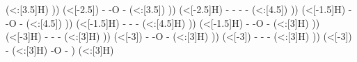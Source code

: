 \begin{struct}
{                        (<:[3.5]H)
                    ))
                      (<[-2.5])
                    -
                    -\textcolor{O}{O}
                    -
                      (<:[3.5])
                  ))
                    (<[-2.5]H)
                  -
                  -
                  -
                  -
                    (<:[4.5])
                ))
                  (<[-1.5]H)
                -
                -\textcolor{O}{O}
                -
                  (<:[4.5])
              ))
                (<[-1.5]H)
              -
              -
              -
                (<:[4.5]H)
            ))
              (<[-1.5]H)
            -
            -\textcolor{O}{O}
            -
              (<:[3]H)
          ))
            (<[-3]H)
          -
          -
          -
            (<:[3]H)
        ))
          (<[-3])
        -
        -\textcolor{O}{O}
        -
          (<:[3]H)
      ))
        (<[-3])
      -
      -
      -
        (<:[3]H)
    ))
      (<[-3])
    -
      (<:[3]H)
    -\textcolor{O}{O}
    -
  )
    (<:[3]H)
}
\end{struct}
